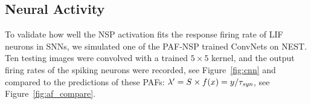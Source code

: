 	
	\subsection{Neural Activity}
	To validate how well the NSP activation fits the response firing rate of LIF neurons in SNNs, we simulated one of the PAF-NSP trained ConvNets on NEST.
	Ten testing images were convolved with a trained $5\times5$ kernel, and the output firing rates of the spiking neurons were recorded, see Figure~\ref{fig:cnn} and compared to the predictions of these PAFs: $\lambda' = S \times f(x) = y/\tau_{\textit{\textrm{syn}}}$, see Figure~\ref{fig:af_compare}.
	
